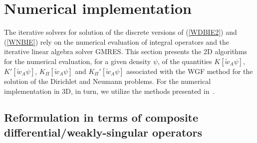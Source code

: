 \documentclass[10pt]{article}
\numberwithin{equation}{section}
\begin{document}
\section{Numerical implementation}
\label{sec:4}

The iterative solvers for solution of the discrete versions of
(\ref{WDBIE2}) and (\ref{WNBIE}) rely on the numerical evaluation of
integral operators and the iterative linear algebra solver GMRES. This
section presents the 2D algorithms for the numerical evaluation, for a
given density $\psi$, of the quantities $K[\widetilde{w}_A\psi]$,
$K'[\widetilde{w}_A\psi]$, $K_\Pi[\widetilde{w}_A\psi]$ and
$K_\Pi'[\widetilde{w}_A\psi]$ associated with the WGF method for
the solution of the Dirichlet and Neumann problems. For the numerical
implementation in 3D, in turn, we utilize the methods presented
in~\cite{BG18,BY19}.

\subsection{Reformulation in terms of composite differential/weakly-singular operators}
\label{sec:4.1}
\end{document}
